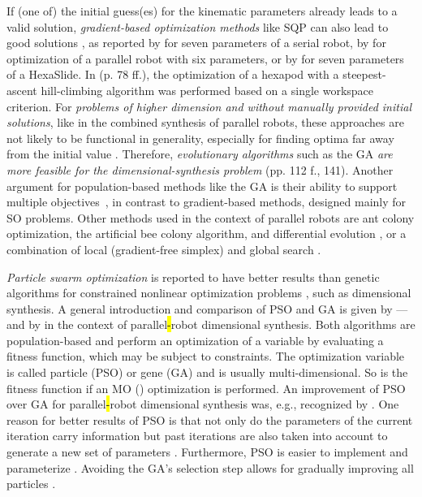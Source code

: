 If (one of) the initial guess(es) for the kinematic parameters already leads to a valid solution, \emph{gradient-based optimization methods} like SQP can also lead to good solutions \cite{LouZhaHuaChe2013}, as reported by \cite{CeccarelliLan2004} for seven parameters of a serial robot, by \cite{CarboneOttCec2007} for optimization of a parallel robot with six parameters, or by \cite{RaoRaoSah2005} for seven parameters of a HexaSlide.
In \cite{Daake2012} (p. 78 ff.), the optimization of a hexapod with a steepest-ascent hill-climbing algorithm was performed based on a single workspace criterion.
%
%
%
%
%
%
%
%
%
%
For \emph{problems of higher dimension and without manually provided initial solutions}, like in the combined synthesis of parallel robots, these approaches are not likely to be functional in generality, especially for finding optima far away from the initial value \cite{LouZhaHuaChe2013}.
Therefore, \emph{evolutionary algorithms} such as the GA \emph{are more feasible for the dimensional-synthesis problem} \cite{Krefft2006} (pp. 112 f., 141).
%
%
Another argument for population-based methods like the GA is their ability to support multiple objectives~\cite{KivelaeMatPuu2017}, in contrast to gradient-based methods, designed mainly for SO problems.
%
Other methods used in the context of parallel robots are ant colony optimization, the artificial bee colony algorithm, and differential evolution \cite{YangYeLi2022}, {or a combination of local (gradient-free  simplex) and global search \cite{SalunkheMicKumSan2022}.}
%

%
%

\emph{Particle swarm optimization} is reported to have better results than genetic algorithms for constrained nonlinear optimization problems \cite{HassanCohDeVen2005}, such as dimensional synthesis.
A general introduction and comparison of PSO and GA is given by \cite{HassanCohDeVen2005}---and by \cite{YangYeLi2022} {in} the context of parallel\hl{-}robot dimensional synthesis.
Both algorithms are population-based and perform an optimization of a variable by evaluating a fitness function, which may be subject to constraints.
The optimization variable is called particle (PSO) or gene (GA) and is usually multi-dimensional.
So is the fitness function if an MO () optimization is performed.
An improvement of PSO over GA for parallel\hl{-}robot dimensional synthesis was, e.g., recognized by \cite{YunLi2011,LouZhaHuaChe2013}.
%
%
%
%
%
One reason for better results of PSO is that not only do the parameters of the current iteration carry information but past iterations are also taken into account to generate a new set of parameters \cite{CoelloPulLec2004}.
Furthermore, {PSO} is easier to implement and parameterize \cite{SunLia2018}.
Avoiding the GA's selection step allows for gradually improving all particles \cite{WangZhaCheHua2017}.

